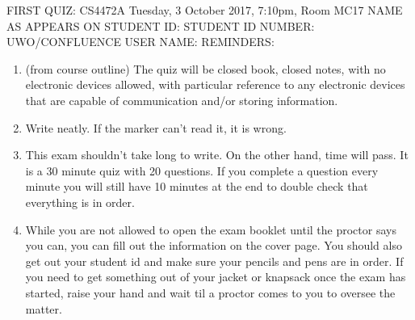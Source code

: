 \documentclass{exam}
\begin{document}
FIRST QUIZ: CS4472A Tuesday, 3 October 2017, 7:10pm, Room MC17\newline
\newline
\newline
\newline
NAME AS APPEARS ON STUDENT ID:\newline
\newline
STUDENT ID NUMBER:\newline
\newline
UWO/CONFLUENCE USER NAME:\newline
\newline
REMINDERS:
\begin{enumerate}
\item (from course outline) The quiz will be closed book, closed notes, with no electronic devices allowed, with particular reference to any electronic devices that are capable of communication and/or storing information.
\item Write neatly.  If the marker can't read it, it is wrong.
\item This exam shouldn't take long to write.  On the other hand, time will pass.  It is a 30 minute quiz with 20 questions.  If you complete a question every  minute you will still have 10 minutes at the end to double check that everything is in order.
\item While you are not allowed to open the exam booklet until the proctor says you can, you can fill out the information on the cover page.  You should also get out your student id and make sure your pencils and pens are in order.  If you need to get something out of your jacket or knapsack once the exam has started, raise your hand and wait til a proctor comes to you to oversee the matter.
\end{enumerate}
\newpage
\end{document}
